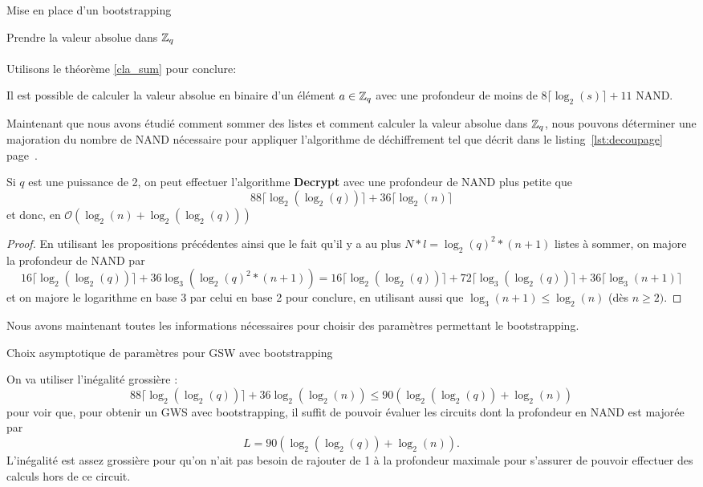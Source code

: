 \begin{section}{Mise en place d'un bootstrapping}
\begin{subsection}{Prendre la valeur absolue dans $\mathbb{Z}_q$}
\paragraph{}
Utilisons le théorème \ref{cla_sum} pour conclure:
\begin{prop}
Il est possible de calculer la valeur absolue en binaire d'un élément $a\in \mathbb{Z}_q$ avec une profondeur de moins de
$8\lceil \log_2(s) \rceil + 11$ NAND.
\end{prop}
\end{subsection}

Maintenant que nous avons étudié comment sommer des listes et comment calculer la valeur absolue dans
$\mathbb{Z}_q$, nous pouvons déterminer une majoration du nombre de NAND nécessaire pour appliquer l'algorithme
de déchiffrement tel que décrit dans le listing~\ref{lst:decoupage} page~\pageref{lst:decoupage}.
\begin{thm} \label{size_dec}
Si $q$ est une puissance de 2, on peut effectuer 
l'algorithme \textbf{Decrypt} avec une profondeur de NAND plus petite que
\[88 \lceil \log_2(\log_2(q)) \rceil + 36 \lceil \log_2(n) \rceil \]
et donc, en $\mathcal{O}(\log_2(n) + \log_2(\log_2(q)))$
\end{thm}
\begin{proof}
En utilisant les propositions précédentes ainsi que le fait qu'il y a au plus $N*l = \log_2(q)^2 * (n+1)$ listes à
sommer, on majore la profondeur de NAND par
\[16 \lceil \log_2(\log_2(q)) \rceil + 36 \log_3\left(\log_2(q)^2
*(n+1)\right) = 16 \lceil \log_2(\log_2(q)) \rceil + 72 \lceil \log_3(\log_2(q)) \rceil + 36 \lceil \log_3(n+1) \rceil \]
et on majore le logarithme en base 3 par celui en base 2 pour conclure, en
utilisant aussi que $\log_3(n+1) \leqslant\log_2(n)$ (dès $n \geqslant 2)$.
\end{proof}

Nous avons maintenant toutes les informations nécessaires pour choisir des paramètres permettant le bootstrapping.

\begin{subsection}{Choix asymptotique de paramètres pour GSW avec bootstrapping}
\label{sec:bootstrapping}

On va utiliser l'inégalité grossière :
\[88 \lceil\log_2(\log_2(q))\rceil + 36 \log_2(\log_2(n)) \leqslant 90\left(\log_2(\log_2(q)) + \log_2(n)\right) \]
pour voir que, pour obtenir un GWS avec bootstrapping, il suffit de pouvoir évaluer les circuits dont la profondeur en NAND est majorée par
\[ L = 90 \left(\log_2(\log_2(q)) + \log_2(n)\right). \]
L'inégalité est assez grossière pour qu'on n'ait pas besoin de rajouter de 1 à la profondeur maximale pour s'assurer de pouvoir effectuer des calculs hors de ce circuit.


\end{subsection}
\end{section}

